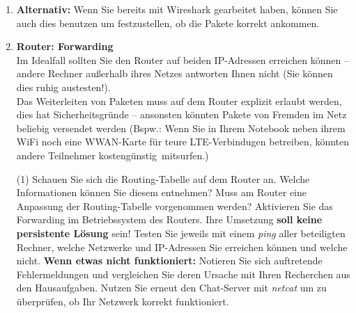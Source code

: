 \documentclass[paper=a4,fontsize=11pt]{scrartcl}%
\numberwithin{equation}{section}
\begin{document}
\begin{enumerate}
	\begin{lstlisting}[style=Bash, language=Bash, label={netcat_server}]
#Server port > 1024 
nc -l -p <port_number> <ip_of_server>
#example
nc -l -p 4711 10.0.0.1
		\end{lstlisting}
		
		\begin{lstlisting}[style=Bash, language=Bash, label={netcat_client}]
#Client 
nc <ip_of_server> <port_number>
#example
nc 10.0.0.1 4711
		\end{lstlisting}
		\item \textbf{Alternativ:} Wenn Sie bereits mit Wireshark gearbeitet haben, können Sie auch dies benutzen um festzustellen, ob die Pakete korrekt ankommen. 
	\item \textbf{Router: Forwarding}\\
	Im Idealfall sollten Sie den Router auf beiden IP-Adressen erreichen können -- andere Rechner außerhalb ihres Netzes antworten Ihnen nicht (Sie können dies ruhig austesten!).\\
	Das Weiterleiten von Paketen muss auf dem Router explizit erlaubt werden, dies hat Sicherheitsgründe -- ansonsten könnten Pakete von Fremden im Netz beliebig versendet werden (Bspw.: Wenn Sie in Ihrem Notebook neben ihrem WiFi noch eine WWAN-Karte für teure LTE-Verbindugen betreiben, könnten andere Teilnehmer \glqq kostengünstig\grqq\ mitsurfen.)
	\begin{tasks}(1)
		\task Schauen Sie sich die Routing-Tabelle auf dem Router an. Welche Informationen können Sie diesem entnehmen?
        	\task Muss am Router eine Anpassung der Routing-Tabelle vorgenommen werden?
        	\task Aktivieren Sie das Forwarding im Betriebssystem des Routers. Ihre Umsetzung \textbf{soll keine persistente Lösung} sein! 
		\task Testen Sie jeweils mit einem \emph{ping} aller beteiligten Rechner, welche Netzwerke und IP-Adressen Sie erreichen können und welche nicht.
		\task \textbf{Wenn etwas nicht funktioniert:} Notieren Sie sich auftretende Fehlermeldungen und vergleichen Sie deren Ursache mit Ihren Recherchen aus den Hausaufgaben.
		\task Nutzen Sie erneut den Chat-Server mit \emph{netcat} um zu überprüfen, ob Ihr Netzwerk korrekt funktioniert.
	\end{tasks}
\end{enumerate}
\end{document}
